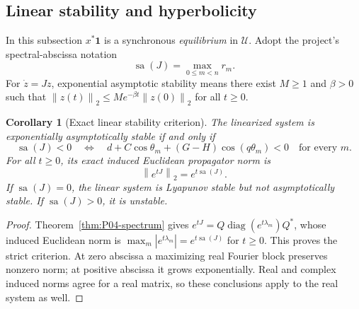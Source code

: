 \documentclass[11pt]{article}
\newcommand{\one}{\mathbf{1}}
\newcommand{\Domain}{\mathcal{U}}
\newcommand{\norm}[1]{\left\lVert #1\right\rVert}
\DeclareMathOperator{\sa}{sa}
\DeclareMathOperator{\diag}{diag}
\newtheorem{corollary}[theorem]{Corollary}
\theoremstyle{definition}
\theoremstyle{remark}
\begin{document}
\subsection{Linear stability and hyperbolicity}
\label{slot:P04-3}

In this subsection $x^*\one$ is a synchronous \emph{equilibrium}
in $\Domain$. Adopt the project's spectral-abscissa notation
\begin{equation}
 \sa(J)=\max_{0\le m<n}r_m.
 \label{eq:P04-abscissa}
\end{equation}
For $\dot z=Jz$, exponential asymptotic stability means there exist
$M\ge1$ and $\beta>0$ such that
$\norm{z(t)}_2\le Me^{-\beta t}\norm{z(0)}_2$ for all $t\ge0$.

\begin{corollary}[Exact linear stability criterion]
\label{cor:P04-stability}
The linearized system is exponentially asymptotically stable if and
only if
\begin{equation}
 \boxed{\sa(J)<0\quad\Longleftrightarrow\quad
   d+C\cos\theta_m+(G-H)\cos(q\theta_m)<0
      \quad\text{for every }m.}
 \label{eq:P04-stability}
\end{equation}
For all $t\ge0$, its exact induced Euclidean propagator norm is
\begin{equation}
 \boxed{\norm{e^{tJ}}_2=e^{t\sa(J)}.}
 \label{eq:P04-semigroup}
\end{equation}
If $\sa(J)=0$, the linear system is Lyapunov stable but not
asymptotically stable. If $\sa(J)>0$, it is unstable.
\end{corollary}
\begin{proof}
Theorem~\ref{thm:P04-spectrum} gives
$e^{tJ}=Q\diag(e^{t\lambda_m})Q^*$, whose induced Euclidean norm
is $\max_m|e^{t\lambda_m}|=e^{t\sa(J)}$ for $t\ge0$.
This proves the strict criterion. At zero abscissa a maximizing real
Fourier block preserves nonzero norm; at positive abscissa it grows
exponentially. Real and complex induced norms agree for a real matrix,
so these conclusions apply to the real system as well.
\end{proof}
\end{document}
